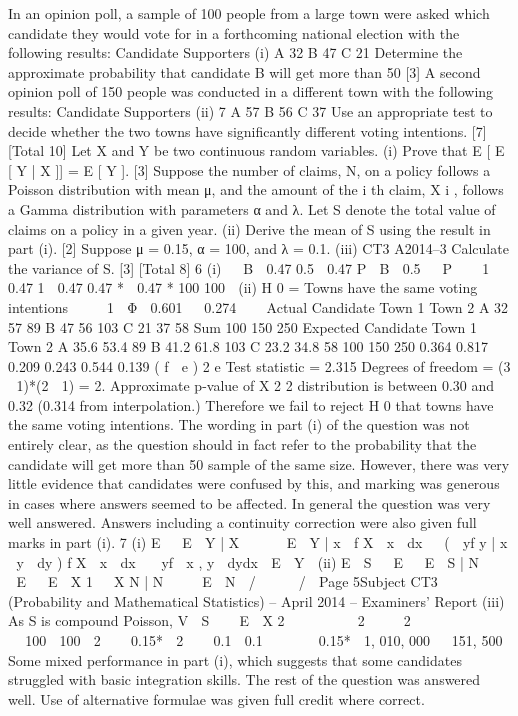 

In an opinion poll, a sample of 100 people from a large town were asked which
candidate they would vote for in a forthcoming national election with the following
results:
Candidate
Supporters
(i)
A
32
B
47
C
21
Determine the approximate probability that candidate B will get more than
50%
[3]
A second opinion poll of 150 people was conducted in a different town with the
following results:
Candidate
Supporters
(ii)
7
A
57
B
56
C
37
Use an appropriate test to decide whether the two towns have significantly
different voting intentions.
[7]
[Total 10]
Let X and Y be two continuous random variables.
(i)
Prove that E [ E [ Y | X ]] = E [ Y ].
[3]
Suppose the number of claims, N, on a policy follows a Poisson distribution with
mean μ, and the amount of the i th claim, X i , follows a Gamma distribution with
parameters α and λ. Let S denote the total value of claims on a policy in a given year.
(ii)
Derive the mean of S using the result in part (i).
[2]
Suppose μ = 0.15, α = 100, and λ = 0.1.
(iii)
CT3 A2014–3
Calculate the variance of S.
[3]
[Total 8]
6
(i) 

B  0.47
0.5  0.47
P  B  0.5   P 


1  0.47
1  0.47
0.47 *
 0.47 *
100
100

(ii) H 0 = Towns have the same voting intentions


  1  Φ  0.601   0.274



Actual Candidate
Town 1
Town 2 A
32
57
89 B
47
56
103 C
21
37
58 Sum
100
150
250
Expected Candidate
Town 1
Town 2 A
35.6
53.4
89 B
41.2
61.8
103 C
23.2
34.8
58 100
150
250
0.364 0.817 0.209 0.243 0.544 0.139
( f  e ) 2
e
Test statistic = 2.315
Degrees of freedom = (3  1)*(2  1) = 2. Approximate p-value of X 2 2
distribution is between 0.30 and 0.32 (0.314 from interpolation.)
Therefore we fail to reject H 0 that towns have the same voting intentions.
The wording in part (i) of the question was not entirely clear, as the question should in fact
refer to the probability that the candidate will get more than 50%
sample of the same size. However, there was very little evidence that candidates were
confused by this, and marking was generous in cases where answers seemed to be affected.
In general the question was very well answered. Answers including a continuity correction
were also given full marks in part (i).
7
(i)
E   E  Y | X      E  Y | x  f X  x  dx   (  yf y | x  y  dy ) f X  x  dx
  yf  x , y  dydx  E  Y 
(ii)
E  S   E   E  S | N     E   E  X 1  X N | N     E  N  /     / 
Page 5Subject CT3 (Probability and Mathematical Statistics) – April 2014 – Examiners’ Report
(iii)
As S is compound Poisson,
V  S    E  X 2 
 
     2 
   2    
     


 100  100  2 

 0.15*  2  
 0.1  0.1   


 0.15*  1, 010, 000 
 151, 500
Some mixed performance in part (i), which suggests that some candidates struggled with
basic integration skills. The rest of the question was answered well. Use of alternative
formulae was given full credit where correct.
